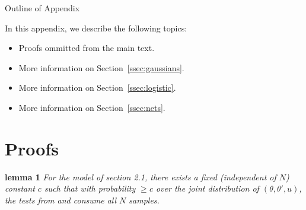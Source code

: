 \documentclass{article}
\begin{document}
\small


\normalsize

\clearpage
\appendix

\begin{center}
{\Large Outline of Appendix}
\end{center}

In this appendix, we describe the following topics:

\begin{itemize}[noitemsep]
  \item Proofs ommitted from the main text. 
    \item More information on Section~\ref{ssec:gaussians}.
    \item More information on Section~\ref{ssec:logistic}.
    \item More information on Section~\ref{ssec:nets}.
\end{itemize}

\section{Proofs}\label{app:proofs}

{\bf lemma 1}
{\em  For the model of section 2.1, there
  exists a fixed (independent of $N$) constant $c$ such that with probability $ \geq c$ over the joint
  distribution of $(\theta, \theta', u)$, the
  tests from \cite{icml2014c1_bardenet14} and \cite{cutting_mh_2014} consume all $N$ samples. }
\end{document}
